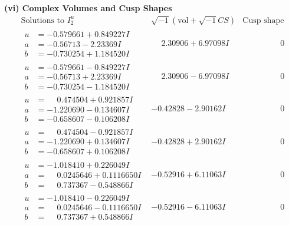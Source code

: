 \documentclass[1p]{elsarticle_modified}
\theoremstyle{definition}
\newcommand{\I}{\sqrt{-1}}
\begin{document}
\newpage\flushleft \textbf{(vi) Complex Volumes and Cusp Shapes}
$$\begin{array}{c|c|c}  
\text{Solutions to }I^u_{2}& \I (\text{vol} + \sqrt{-1}CS) & \text{Cusp shape}\\
 \hline 
\begin{aligned}
u &= -0.579661 + 0.849227 I \\
a &= -0.56713 - 2.23369 I \\
b &= -0.730254 + 1.184520 I\end{aligned}
 & \phantom{-}2.30906 + 6.97098 I & \phantom{-0.000000 } 0 \\ \hline\begin{aligned}
u &= -0.579661 - 0.849227 I \\
a &= -0.56713 + 2.23369 I \\
b &= -0.730254 - 1.184520 I\end{aligned}
 & \phantom{-}2.30906 - 6.97098 I & \phantom{-0.000000 } 0 \\ \hline\begin{aligned}
u &= \phantom{-}0.474504 + 0.921857 I \\
a &= -1.220690 - 0.134607 I \\
b &= -0.658607 - 0.106208 I\end{aligned}
 & -0.42828 - 2.90162 I & \phantom{-0.000000 } 0 \\ \hline\begin{aligned}
u &= \phantom{-}0.474504 - 0.921857 I \\
a &= -1.220690 + 0.134607 I \\
b &= -0.658607 + 0.106208 I\end{aligned}
 & -0.42828 + 2.90162 I & \phantom{-0.000000 } 0 \\ \hline\begin{aligned}
u &= -1.018410 + 0.226049 I \\
a &= \phantom{-}0.0245646 + 0.1116650 I \\
b &= \phantom{-}0.737367 - 0.548866 I\end{aligned}
 & -0.52916 + 6.11063 I & \phantom{-0.000000 } 0 \\ \hline\begin{aligned}
u &= -1.018410 - 0.226049 I \\
a &= \phantom{-}0.0245646 - 0.1116650 I \\
b &= \phantom{-}0.737367 + 0.548866 I\end{aligned}
 & -0.52916 - 6.11063 I & \phantom{-0.000000 } 0 \\ \hline\begin{aligned}

\end{aligned}
\end{array}$$
\end{document}
